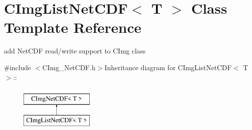 \hypertarget{classCImgListNetCDF}{
\section{CImgListNetCDF$<$ T $>$ Class Template Reference}
\label{classCImgListNetCDF}
}


add NetCDF read/write support to CImg class  


{\ttfamily \#include $<$CImg\_\-NetCDF.h$>$}Inheritance diagram for CImgListNetCDF$<$ T $>$::\begin{figure}[H]
\begin{center}
\leavevmode
\includegraphics[height=2cm]{classCImgListNetCDF}
\end{center}
\end{figure}
